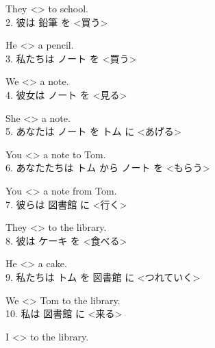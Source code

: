 \documentclass[uplatex,
paper=a4,
fontsize=18pt,
jafontsize=16pt,
number_of_lines=30,
line_length=30zh,
baselineskip=25pt,
]{jlreq}
\begin{document}
  They <\hspace{3em}> to school.
\\

2.  彼は 鉛筆 を <買う>

  He <\hspace{3em}> a pencil.
\\

3.  私たちは ノート を <買う>

  We <\hspace{3em}> a note.
\\

4.  彼女は ノート を <見る>

  She <\hspace{3em}> a note.
\\

5.  あなたは ノート を トム に <あげる>

  You <\hspace{3em}> a note to Tom.
\\

6.  あなたたちは トム から ノート を <もらう>

  You <\hspace{3em}> a note from Tom.
\\

7.  彼らは 図書館 に <行く>

  They <\hspace{3em}> to the library.
\\

8.  彼は ケーキ を <食べる>

  He <\hspace{3em}> a cake.
\\

9.  私たちは トム を 図書館 に <つれていく>

  We <\hspace{3em}> Tom to the library.
\\

10.  私は 図書館 に <来る>

  I <\hspace{3em}> to the library.
\\
\end{document}
